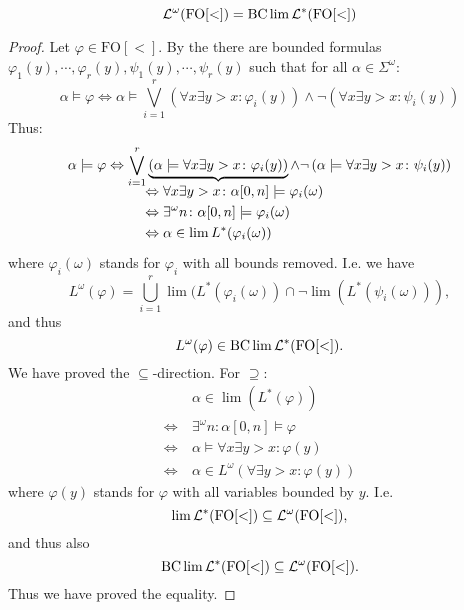 \begin{theorem}
\[ \mathcal{L}^\omega (\mathrm{FO[<]}) = \operatorname{BC} \lim \mathcal{L}^*(\mathrm{FO[<]}) \]
\begin{proof}
Let $\varphi \in \mathrm{FO[<]}$. By the \cite[Normal Form Theorem (4.4)]{CombR107} there are bounded formulas $\varphi_1(y),\dotsb,\varphi_r(y),\psi_1(y),\dotsb,\psi_r(y)$ such that for all $\alpha \in \Sigma^\omega$:
\[ \alpha \models \varphi \Leftrightarrow \alpha \models \bigvee_{i=1}^r \left( \forall x \exists y > x \colon \varphi_i (y) \right) \wedge \neg \left( \forall x \exists y > x \colon \psi_i (y) \right) \]
Thus:
\[
\alpha \models \varphi \Leftrightarrow \bigvee_{i=1}^r
\underbrace{ \left( \alpha \models \forall x \exists y > x \colon \varphi_i (y) \right) }_
{\mathclap{\quad\quad \begin{aligned}
& \Leftrightarrow \forall x \exists y > x \colon \alpha[0,n] \models \varphi_i(\omega) \\
& \Leftrightarrow \exists^\omega n \colon \alpha[0,n] \models \varphi_i(\omega) \\
& \Leftrightarrow \alpha \in \lim L^*( \varphi_i(\omega) )
\end{aligned}}}
\wedge \neg \left( \alpha \models \forall x \exists y > x \colon \psi_i (y) \right)
\]
where $\varphi_i(\omega)$ stands for $\varphi_i$ with all bounds removed.
I.e. we have
\[ L^\omega(\varphi) = \bigcup_{i=1}^r \lim( L^* (\varphi_i (\omega)) \cap \neg \lim( L^* (\psi_i (\omega))) , \]
and thus
\[ L^\omega(\varphi) \in \operatorname{BC} \lim \mathcal{L}^* (\mathrm{FO[<]}) . \]
We have proved the $\subseteq$-direction. For $\supseteq$:
\begin{align*}
& \alpha \in \lim( L^*(\varphi) ) \\
\Leftrightarrow \ & \exists^\omega n \colon \alpha[0,n] \models \varphi \\
\Leftrightarrow \ & \alpha \models \forall x \exists y > x \colon \varphi(y) \\
\Leftrightarrow \ & \alpha \in L^\omega ( \forall \exists y > x \colon \varphi(y) )
\end{align*}
where $\varphi(y)$ stands for $\varphi$ with all variables bounded by $y$.
I.e.
\[ \lim \mathcal{L}^* (\mathrm{FO[<]}) \subseteq \mathcal{L}^\omega (\mathrm{FO[<]}) , \]
and thus also
\[ \operatorname{BC} \lim \mathcal{L}^* (\mathrm{FO[<]}) \subseteq \mathcal{L}^\omega (\mathrm{FO[<]}) . \]
Thus we have proved the equality.
\end{proof}
\end{theorem}


